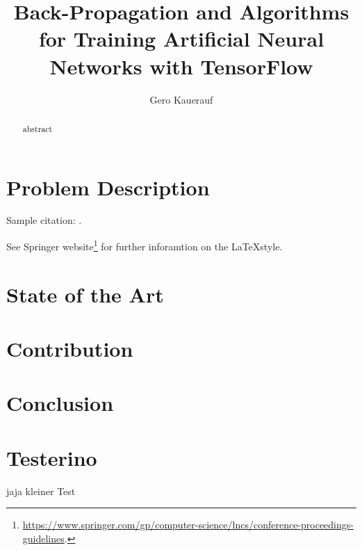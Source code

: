 \documentclass[runningheads]{llncs}
\begin{document}

%
\title{Back-Propagation and Algorithms for Training Artificial Neural Networks with TensorFlow}
%
%
\author{Gero Kauerauf}
%
%
%
\maketitle              %
%
\begin{abstract}
abstract
\end{abstract}
%
%
%
\section{Problem Description}

Sample citation: \cite{gelman2013bayesian}.

See Springer website\footnote{\url{https://www.springer.com/gp/computer-science/lncs/conference-proceedings-guidelines}.} for further inforamtion on the \LaTeX style.
\section{State of the Art}


\section{Contribution}

\section{Conclusion}

%
%
%



\newpage

\section{Testerino}
jaja kleiner Test


\end{document}

